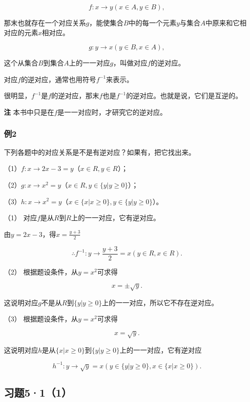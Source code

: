 \[
f: x \rightarrow y (x \in A, y \in B),
\]

那末也就存在一个对应关系\(g\)，能使集合\(B\)中的每一个元素\(y\)与集合\(A\)中原来和它相对应的元素\(x\)相对应。

\[
g: y \rightarrow x (y \in B, x \in A),
\]

这个从集合\(B\)到集合\(A\)上的一一对应\(g\)，叫做对应\(f\)的逆对应。

对应\(f\)的逆对应，通常也用符号\(f^{-1}\)来表示。

很明显，\(f^{-1}\)是\(f\)的逆对应，那末\(f\)也是\(f^{-1}\)的逆对应。也就是说，它们是互逆的。

\textbf{注} 本书中只是在\(f\)是一一对应时，才研究它的逆对应。

\subsubsection{例2}

下列各题中的对应关系是不是有逆对应？如果有，把它找出来。

（1）\(f: x \to 2x - 3 = y\)（\(x \in R, y \in R\)）；

（2）\(g: x \to x^2 = y\)（\(x \in R, y \in \{y | y \geqslant 0\}\)）；

（3）\(h: x \to x^2 = y\)（\(x \in \{x | x \geqslant 0\}, y \in \{y | y \geqslant 0\}\)）。

 （1）
对应\(f\)是从\(R\)到\(R\)上的一一对应，它有逆对应。

由\(y = 2x - 3\)，得\(x = \frac{y + 3}{2}\)

\[
\therefore f^{- 1}: y \rightarrow \frac{y + 3}{2} = x (y \in R, x \in R).
\]

（2） 根据题设条件，从\(y = x^2\)可求得

\[
x = \pm \sqrt{y}.
\]

这说明对应\(g\)不是从\(R\)到\(\{y|y\geqslant 0\}\)上的一一对应，所以它不存在逆对应。

（3） 根据题设条件，从\(y = x^2\)可求得

\[
x = \sqrt{y}.
\]

这说明对应\(h\)是从\(\{x|x\geqslant 0\}\)到\(\{y|y\geqslant 0\}\)上的一一对应，它有逆对应

\[
h^{- 1}: y \rightarrow \sqrt{y} = x (y \in \{y | y \geqslant 0 \}, x \in \{x | x \geqslant 0 \}).
\]

\subsection{习题5·1（1）}

